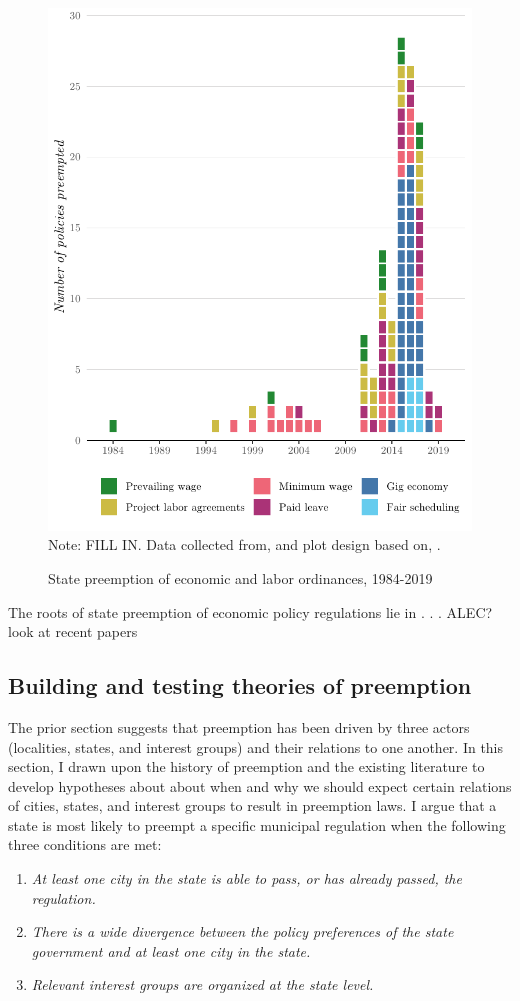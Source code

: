 \documentclass[12pt]{article}
\begin{document}
\begin{figure}[!ht]
\caption{State preemption of economic and labor ordinances, 1984-2019}
\label{fig:policies}
\centering
\includegraphics[width=.75\textwidth]{plots/preemption_plot}
\newline\scriptsize{Note: FILL IN. Data collected from, and plot design based on, \textcite{economicpolicyinstituteWorkerRightsPreemption2018}.}
\end{figure}



The roots of state preemption of economic policy regulations lie in . . . 
ALEC? look at recent papers 


\subsection*{Building and testing theories of preemption}
The prior section suggests that preemption has been driven by three actors (localities, states, and interest groups) and their relations to one another. In this section, I drawn upon the history of preemption and the existing literature to develop hypotheses about about when and why we should expect certain relations of cities, states, and interest groups to result in preemption laws. I argue that a state is most likely to preempt a specific municipal regulation when the following three conditions are met:

\singlespacing
\begin{enumerate}
	\item \textit{At least one city in the state is able to pass, or has already passed, the regulation.}
	\item \textit{There is a wide divergence between the policy preferences of the state government and at least one city in the state.}
	\item \textit{Relevant interest groups are organized at the state level.}
\end{enumerate}
\end{document}

